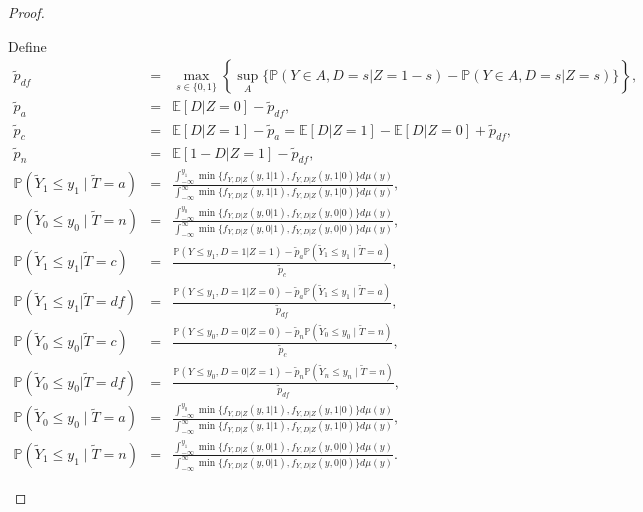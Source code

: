 \documentclass[12pt]{article}
\theoremstyle{plain}
\theoremstyle{definition}
\theoremstyle{remark}
\begin{document}
\begin{proof}
\begin{enumerate}
Define 
\begin{eqnarray*}
    \tilde{p}_{df} &=&\max_{s \in\{0,1\}}\left\{\sup _A\{\mathbb{P}(Y \in A, D=s  \vert  Z=1-s)-\mathbb{P}(Y \in A, D=s  \vert  Z=s)\}\right\},\\
    \tilde{p}_a &=& \mathbb E[D \vert Z=0]-\tilde{p}_{df}, \\ \tilde{p}_{c}&=&\mathbb E[D \vert Z=1]-\tilde{p}_a=\mathbb E[D\vert Z=1]-\mathbb E[D \vert Z=0]+\tilde{p}_{df},\\
    \tilde{p}_n &=& \mathbb E[1-D \vert Z=1]-\tilde{p}_{df},\\
    \mathbb P(\tilde{Y}_1 \leq y_1 \mid \tilde{T}=a) &=& \frac{\int^{y_1}_{-\infty}\min\{f_{Y,D\vert Z}(y,1\vert 1),f_{Y,D\vert Z}(y,1\vert 0)\}d\mu(y)}{\int^{\infty}_{-\infty}\min\{f_{Y,D\vert Z}(y,1\vert 1),f_{Y,D\vert Z}(y,1\vert 0)\}d\mu(y)},\\
    \mathbb P(\tilde{Y}_0 \leq y_0 \mid \tilde{T}=n) &=& \frac{\int^{y_0}_{-\infty}\min\{f_{Y,D\vert Z}(y,0\vert 1),f_{Y,D\vert Z}(y,0\vert 0)\}d\mu(y)}{\int^{\infty}_{-\infty}\min\{f_{Y,D\vert Z}(y,0\vert 1),f_{Y,D\vert Z}(y,0\vert 0)\}d\mu(y)},\\
    \mathbb P(\tilde{Y}_1 \leq y_1 \vert \tilde{T}=c) &=& \frac{\mathbb P(Y \leq y_1, D=1 \vert Z=1)-\tilde{p}_a \mathbb P(\tilde{Y}_1 \leq y_1 \mid \tilde{T}=a)}{\tilde{p}_c},\\
    \mathbb P(\tilde{Y}_1 \leq y_1 \vert \tilde{T}=df) &=& \frac{\mathbb P(Y \leq y_1, D=1 \vert Z=0)-\tilde{p}_a \mathbb P(\tilde{Y}_1 \leq y_1 \mid \tilde{T}=a)}{\tilde{p}_{df}},\\
    \mathbb P(\tilde{Y}_0 \leq y_0 \vert \tilde{T}=c) &=& \frac{\mathbb P(Y \leq y_0, D=0 \vert Z=0)-\tilde{p}_n \mathbb P(\tilde{Y}_0 \leq y_0 \mid \tilde{T}=n)}{\tilde{p}_c},\\
    \mathbb P(\tilde{Y}_0 \leq y_0 \vert \tilde{T}=df) &=& \frac{\mathbb P(Y \leq y_0, D=0 \vert Z=1)-\tilde{p}_n \mathbb P(\tilde{Y}_n \leq y_n \mid \tilde{T}=n)}{\tilde{p}_{df}},\\
   \mathbb P(\tilde{Y}_0 \leq y_0 \mid \tilde{T}=a) &=& \frac{\int^{y_0}_{-\infty}\min\{f_{Y,D\vert Z}(y,1\vert 1),f_{Y,D\vert Z}(y,1\vert 0)\}d\mu(y)}{\int^{\infty}_{-\infty}\min\{f_{Y,D\vert Z}(y,1\vert 1),f_{Y,D\vert Z}(y,1\vert 0)\}d\mu(y)},\\
    \mathbb P(\tilde{Y}_1 \leq y_1 \mid \tilde{T}=n) &=& \frac{\int^{y_1}_{-\infty}\min\{f_{Y,D\vert Z}(y,0\vert 1),f_{Y,D\vert Z}(y,0\vert 0)\}d\mu(y)}{\int^{\infty}_{-\infty}\min\{f_{Y,D\vert Z}(y,0\vert 1),f_{Y,D\vert Z}(y,0\vert 0)\}d\mu(y)}. 

\end{eqnarray*}
\end{enumerate}
\end{proof}
\end{document}
